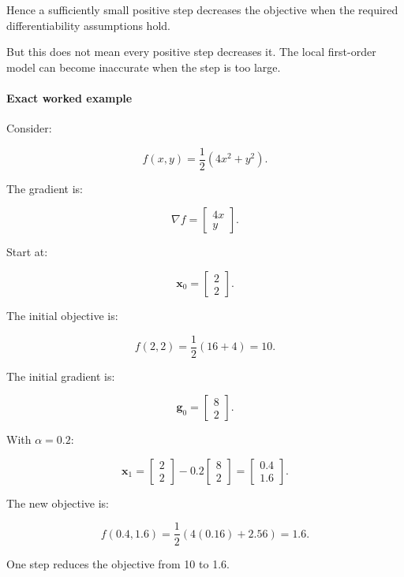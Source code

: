 Hence a sufficiently small positive step decreases the objective when the required differentiability assumptions hold.

But this does not mean every positive step decreases it. The local first-order model can become inaccurate when the step is too large.

\paragraph{Exact worked example}\label{02-foundations-ii-ch026-exact-worked-example}

\hypertarget{02-foundations-ii-ch026-exact-worked-example}{}

Consider:

\[
f(x,y)=\frac12(4x^2+y^2).
\]

The gradient is:

\[
\nabla f= \begin{bmatrix} 4x\\y \end{bmatrix}.
\]

Start at:

\[
\mathbf x_0= \begin{bmatrix}2\\2\end{bmatrix}.
\]

The initial objective is:

\[
f(2,2)=\frac12(16+4)=10.
\]

The initial gradient is:

\[
\mathbf g_0= \begin{bmatrix}8\\2\end{bmatrix}.
\]

With \(\alpha=0.2\):

\[
\mathbf x_1= \begin{bmatrix}2\\2\end{bmatrix} - 0.2 \begin{bmatrix}8\\2\end{bmatrix} = \begin{bmatrix}0.4\\1.6\end{bmatrix}.
\]

The new objective is:

\[
f(0.4,1.6) = \frac12(4(0.16)+2.56) =\boxed{1.6}.
\]

One step reduces the objective from 10 to 1.6.

